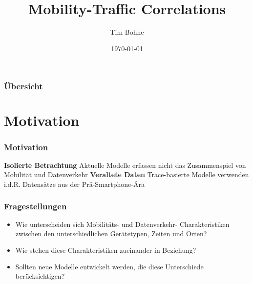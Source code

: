 \documentclass{beamer}
\title[]{Mobility-Traffic Correlations}
\author{Tim Bohne}
\institute[]
{
\textit{Bachelor-Seminar: Mobility and Traffic in Computer Networks}
\medskip
}
\date{\today}
\begin{document}
\begin{frame}[plain] %
\titlepage %
\end{frame}

\begin{frame}
\frametitle{Übersicht} %
\tableofcontents
\end{frame}

\section{Motivation}

\begin{frame}
  \frametitle{Motivation}
  \textit{}
  \newline\newline
  \textbf{Isolierte Betrachtung}\newline
  Aktuelle Modelle erfassen nicht das Zusammenspiel von Mobilität und Datenverkehr\newline\newline
  \textbf{Veraltete Daten}\newline
  Trace-basierte Modelle verwenden i.d.R. Datensätze aus der Prä-Smartphone-Ära
\end{frame}

\begin{frame}
  \frametitle{Fragestellungen}
  \begin{itemize}
    \item Wie unterscheiden sich Mobilitäts- und Datenverkehr- Charakteristiken zwischen den unterschiedlichen Gerätetypen,
    Zeiten und Orten?\newline
    \item Wie stehen diese Charakteristiken zueinander in Beziehung?\newline
    \item Sollten neue Modelle entwickelt werden, die diese Unterschiede berücksichtigen?
\end{itemize}
\end{frame}
\end{document}
